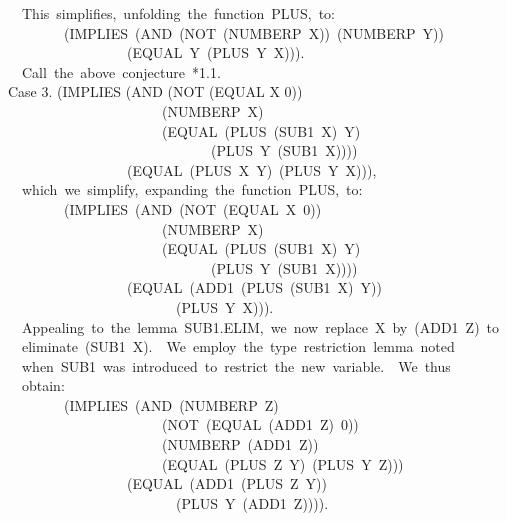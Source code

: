 \documentclass[10pt]{book}
\newenvironment{pubasis}{\begin{flushleft}}{\end{flushleft}}
\begin{document}
\begin{pubasis}
~~This~simplifies,~unfolding~the~function~PLUS,~to:\\

~~~~~~~~(IMPLIES~(AND~(NOT~(NUMBERP~X))~(NUMBERP~Y))\\
~~~~~~~~~~~~~~~~~(EQUAL~Y~(PLUS~Y~X))).\\

~~Call~the~above~conjecture~*1.1.\\

Case 3.	(IMPLIES (AND (NOT (EQUAL X 0))\\
~~~~~~~~~~~~~~~~~~~~~~(NUMBERP~X)\\
~~~~~~~~~~~~~~~~~~~~~~(EQUAL~(PLUS~(SUB1~X)~Y)\\
~~~~~~~~~~~~~~~~~~~~~~~~~~~~~(PLUS~Y~(SUB1~X))))\\
~~~~~~~~~~~~~~~~~(EQUAL~(PLUS~X~Y)~(PLUS~Y~X))),\\

~~which~we~simplify,~expanding~the~function~PLUS,~to:\\

~~~~~~~~(IMPLIES~(AND~(NOT~(EQUAL~X~0))\\
~~~~~~~~~~~~~~~~~~~~~~(NUMBERP~X)\\
~~~~~~~~~~~~~~~~~~~~~~(EQUAL~(PLUS~(SUB1~X)~Y)\\
~~~~~~~~~~~~~~~~~~~~~~~~~~~~~(PLUS~Y~(SUB1~X))))\\
~~~~~~~~~~~~~~~~~(EQUAL~(ADD1~(PLUS~(SUB1~X)~Y))\\
~~~~~~~~~~~~~~~~~~~~~~~~(PLUS~Y~X))).\\

~~Appealing~to~the~lemma~SUB1.ELIM,~we~now~replace~X~by~(ADD1~Z)~to\\
~~eliminate~(SUB1~X).~~We~employ~the~type~restriction~lemma~noted\\
~~when~SUB1~was~introduced~to~restrict~the~new~variable.~~We~thus\\
~~obtain:\\

~~~~~~~~(IMPLIES~(AND~(NUMBERP~Z)\\
~~~~~~~~~~~~~~~~~~~~~~(NOT~(EQUAL~(ADD1~Z)~0))\\
~~~~~~~~~~~~~~~~~~~~~~(NUMBERP~(ADD1~Z))\\
~~~~~~~~~~~~~~~~~~~~~~(EQUAL~(PLUS~Z~Y)~(PLUS~Y~Z)))\\
~~~~~~~~~~~~~~~~~(EQUAL~(ADD1~(PLUS~Z~Y))\\
~~~~~~~~~~~~~~~~~~~~~~~~(PLUS~Y~(ADD1~Z)))).\\


\end{pubasis}
\end{document}
